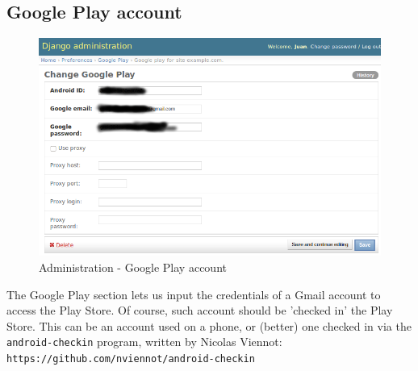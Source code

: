 \documentclass[11pt]{article}
\begin{document}
\subsection{Google Play account}
\begin{figure}[H]
\begin{center}
\includegraphics[width=\textwidth]{graphics/marvin3.png}
\caption{Administration - Google Play account} \label{googleplay_acct}
\end{center}
\end{figure}
The Google Play section lets us input the credentials of a Gmail account to access the Play Store. Of course, such account should be 'checked in' the Play Store. This can be an account used on a phone, or (better) one checked in via the \texttt{android-checkin} program, written by Nicolas Viennot: \texttt{https://github.com/nviennot/android-checkin}
\end{document}
